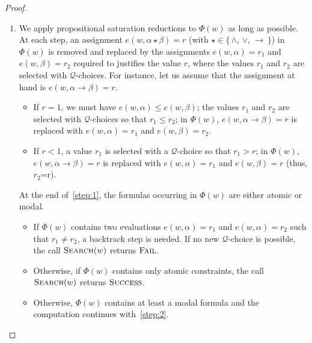 \documentclass[copyright,creativecommons]{eptcs}
\newcommand{\Search}{\textsc{Search}}
\newcommand{\Success}{\textsc{Success}}
\newcommand{\Fail}{\textsc{Fail}}
\renewcommand{\a}{\alpha}
\renewcommand{\b}{\beta}
\newcommand{\Qcal}{\mathcal{Q}}
\begin{document}
\begin{proof}
\begin{enumerate}[label*=(Step~\arabic*)]
\item\label{step:1} We apply propositional saturation reductions to
  $\Phi(w)$ as long as possible. At each step, an assignment
  $e(w,\a\star\b)=r$ (with $\star\in \{\,\land,\,\lor,\,\to\,\}$) in
  $\Phi(w)$ is removed and replaced by the assignments $e(w,\a)=r_1$
  and $e(w,\b)=r_2$ required to justifies the value $r$, where the
  values $r_1$ and $r_2$ are selected with $\Qcal$-choices.  For
  instance, let us assume that the assignment at hand is $e(w,\a\to\b)=r$.
  \begin{itemize}
  \item If $r=1$, we must have $e(w,\a) \leq e(w,\b)$; the values
    $r_1$ and $r_2$ are selected with $\Qcal$-choices so that $r_1\leq
    r_2$; in $\Phi(w)$, $e(w,\a\to \b)=r$ is replaced with $e(w,\a )=
    r_1$ and $e(w,\b)=r_2$.
  \item If $r<1$, a value $r_1$ is selected with a $\Qcal$-choice so
    that $r_1> r$; in $\Phi(w)$, $e(w,\a\to \b)=r$ is replaced with
    $e(w,\a)= r_1$ and $e(w,\b) = r$ (thus, $r_2$=r).
  \end{itemize}
  At the end of~\ref{step:1}, the formulas occurring in $\Phi(w)$ are
  either atomic or modal.
  
  \begin{itemize}
  \item If $\Phi(w)$ contains two evaluations $e(w,\a)=r_1$ and
    $e(w,\a)=r_2$ such that $r_1\neq r_2$, a backtrack step is needed.
    If no new $\Qcal$-choice is possible, the call $\Search(w)$
    returns $\Fail$.

  \item Otherwise, if $\Phi(w)$ contains only atomic constraints, the
    call $\Search(w)$ returns $\Success$.
    
  \item Otherwise, $\Phi(w)$ contains at least  a
    modal formula and the computation continues with~\ref{step:2}.
  \end{itemize}  


\end{enumerate}
\end{proof}
\end{document}
